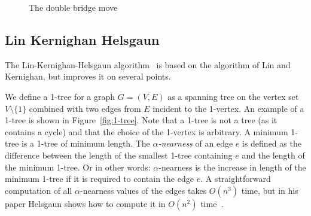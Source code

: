 \documentclass[12pt]{article}
\begin{document}
    \begin{figure}
    \centering
    \caption{The double bridge move}
    \label{fig:double-bridge}
    \end{figure}


    \subsection{Lin Kernighan Helsgaun}
    \label{sec:lkh}
    The Lin-Kernighan-Helsgaun algorithm~\cite{lkh1, lkh2} is based on the algorithm of Lin and
    Kernighan, but improves it on several points.

    We define a 1-tree for a graph $G=(V, E)$ as a spanning tree on the vertex set $V \setminus \{1\}$
    combined with two edges from $E$ incident to the 1-vertex. An example of a 1-tree is shown in
    Figure~\ref{fig:1-tree}. Note that a 1-tree is not a tree (as it contains a cycle) and that the
    choice of the 1-vertex is arbitrary. A minimum 1-tree is a 1-tree of minimum length. The
    \emph{$\alpha$-nearness} of an edge $e$ is defined as the difference between the length of the
    smallest 1-tree containing $e$ and the length of the minimum 1-tree. Or in other words:
    $\alpha$-nearness is the increase in length of the minimum 1-tree if it is required to contain
    the edge $e$.
    A straightforward computation of all $\alpha$-nearness values of the edges takes $O(n^3)$ time,
    but in his paper Helsgaun shows how to compute it in $O(n^2)$ time~\cite{lkh}.
\end{document}
